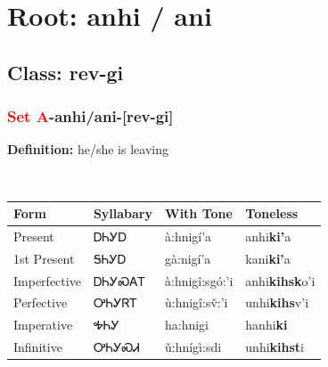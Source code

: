 \needspace{4in}
\section*{Root: anhi / ani}
\nopagebreak
{}
\needspace{3in}
\subsection*{Class: rev-gi}
\nopagebreak
\needspace{2in}
\subsubsection*{\textcolor{Red}{Set A}{-}\textbf{anhi/ani}{-}[rev-gi]}
\nopagebreak
\textbf{Definition: } he/she is leaving
\\[0.5em]
\begin{tabularx}{\textwidth}{l X X X}%
\toprule%
\textbf{Form}&\textbf{Syllabary}&\textbf{With Tone}&\textbf{Toneless}\\%
\midrule%
Present&ᎠᏂᎩᎠ&à:hnigí’a&anhi\textbf{ki'}a\\%
1st Present&ᎦᏂᎩᎠ&gà:nigí’a&kani\textbf{ki'}a\\%
Imperfective&ᎠᏂᎩᏍᎪᎢ&à:hnigî:sgó:’i&anhi\textbf{kihsk}o'i\\%
Perfective&ᎤᏂᎩᏒᎢ&ù:hnigî:sv̌:’i&unhi\textbf{kihs}v'i\\%
Imperative&ᎭᏂᎩ&ha:hnigi&hanhi\textbf{ki}\\%
Infinitive&ᎤᏂᎩᏍᏗ&ǔ:hnígì:sdi&unhi\textbf{kihst}i\\%
\bottomrule%
\end{tabularx}
\\[1em]